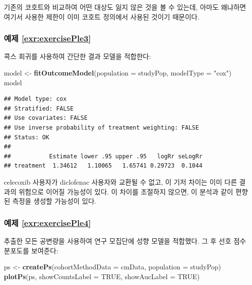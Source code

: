 \documentclass[11pt]{book}
\newenvironment{Shaded}{\begin{snugshade}}{\end{snugshade}}
\newcommand{\KeywordTok}[1]{\textcolor[rgb]{0.13,0.29,0.53}{\textbf{#1}}}
\newcommand{\DataTypeTok}[1]{\textcolor[rgb]{0.13,0.29,0.53}{#1}}
\newcommand{\StringTok}[1]{\textcolor[rgb]{0.31,0.60,0.02}{#1}}
\newcommand{\OtherTok}[1]{\textcolor[rgb]{0.56,0.35,0.01}{#1}}
\newcommand{\NormalTok}[1]{#1}
\theoremstyle{definition}
\theoremstyle{definition}
\theoremstyle{definition}
\theoremstyle{remark}
\begin{document}
기존의 코호트와 비교하여 어떤 대상도 잃지 않은 것을 볼 수 있는데, 아마도
왜냐하면 여기서 사용한 제한이 이미 코호트 정의에서 사용된 것이기
때문이다.

\subsubsection*{예제 \ref{exr:exercisePle3}}\label{-refexrexerciseple3}

콕스 회귀를 사용하여 간단한 결과 모델을 적합한다:

\begin{Shaded}
\begin{Highlighting}[]
\NormalTok{model <-}\StringTok{ }\KeywordTok{fitOutcomeModel}\NormalTok{(}\DataTypeTok{population =}\NormalTok{ studyPop,}
                         \DataTypeTok{modelType =} \StringTok{"cox"}\NormalTok{)}
\NormalTok{model}
\end{Highlighting}
\end{Shaded}

\begin{verbatim}
## Model type: cox
## Stratified: FALSE
## Use covariates: FALSE
## Use inverse probability of treatment weighting: FALSE
## Status: OK
## 
##           Estimate lower .95 upper .95   logRr seLogRr
## treatment  1.34612   1.10065   1.65741 0.29723  0.1044
\end{verbatim}

celecoxib 사용자가 diclofenac 사용자와 교환될 수 없고, 이 기저 차이는
이미 다른 결과의 위험으로 이어질 가능성이 있다. 이 차이를 조절하지
않으면, 이 분석과 같이 편향된 측정을 생성할 가능성이 있다.

\subsubsection*{예제 \ref{exr:exercisePle4}}\label{-refexrexerciseple4}

추출한 모든 공변량을 사용하여 연구 모집단에 성향 모델을 적합했다. 그 후
선호 점수 분포도를 보여준다:

\begin{Shaded}
\begin{Highlighting}[]
\NormalTok{ps <-}\StringTok{ }\KeywordTok{createPs}\NormalTok{(}\DataTypeTok{cohortMethodData =}\NormalTok{ cmData,}
               \DataTypeTok{population =}\NormalTok{ studyPop)}
\KeywordTok{plotPs}\NormalTok{(ps, }\DataTypeTok{showCountsLabel =} \OtherTok{TRUE}\NormalTok{, }\DataTypeTok{showAucLabel =} \OtherTok{TRUE}\NormalTok{)}
\end{Highlighting}
\end{Shaded}
\end{document}
